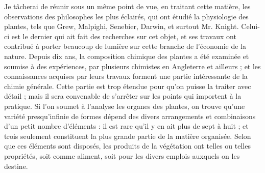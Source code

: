 Je tâcherai de réunir sous un même point de vue, en traitant cette matière, les observations des philosophes les plus éclairés,\setcounter{page}{336} qui ont étudié la physiologie des plantes, tels que Grew, Malpighi, Senebier, Darwin, et surtout Mr. Knight. Celui-ci est le dernier qui ait fait des recherches sur cet objet, et ses travaux ont contribué à porter beaucoup de lumière sur cette branche de l'économie de la nature. Depuis dix ans, la composition chimique des plantes a été examinée et soumise à des expériences, par plusieurs chimistes en Angleterre et ailleurs ; et les connaissances acquises par leurs travaux forment une partie intéressante de la chimie générale. Cette partie est trop étendue pour qu'on puisse la traiter avec détail ; mais il sera convenable de s'arrêter sur les points qui importent à la pratique.
Si l'on soumet à l'analyse les organes des plantes, on trouve qu'une variété presqu'infinie de formes dépend des divers arrangements et combinaisons d'un petit nombre d'éléments : il est rare qu'il y en ait plus de sept à huit ; et trois seulement constituent la plus grande partie de la matière organisée. Selon que ces éléments sont disposés, les produits de la végétation ont telles ou telles propriétés, soit comme aliment, soit pour les divers emplois auxquels on les destine.
